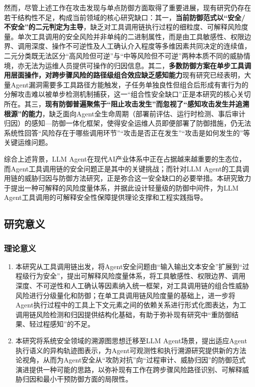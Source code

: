 然而，尽管上述工作在攻击发现与单点防御方面取得了重要进展，现有研究仍存在若干结构性不足，构成当前领域的核心研究缺口：其一，\textbf{当前防御范式以“安全/不安全”的二元判定为主导}，缺乏对工具调用链执行过程的细粒度、可解释风险度量。单次工具调用的安全风险并非单纯的二进制属性，而是由工具敏感性、权限边界、调用深度、操作不可逆性及人工确认介入程度等多维因素共同决定的连续值，二元分类既无法区分“高风险但可逆”与“中等风险但不可逆”两种本质不同的威胁情境，亦无法为运维人员提供可操作的归因信息。其二，\textbf{多数防御方案在单步工具调用层面操作，对跨步骤风险的路径级组合效应缺乏感知能力}现有研究已经表明，大量Agent漏洞需要多工具路径方能触发\cite{wu2026chainfuzzer}，子任务单独良性但组合后形成有害行为的分解攻击难以被单步检测机制捕获\cite{kothamasu2026hidden}，这一“组合性安全缺口”正是本研究的核心关切所在。其三，\textbf{现有防御普遍聚焦于“阻止攻击发生”而忽视了“感知攻击发生并追溯根源”的能力}，缺乏面向Agent全生命周期（部署前评估、运行时检测、事后审计归因）的感知—防御一体化框架，使得安全运维人员即便部署了防御措施，仍无法系统性回答“风险存在于哪些调用环节”“攻击是否正在发生”“攻击是如何发生的”等关键运维问题。

综合上述背景，LLM Agent在现代AI产业体系中正在占据越来越重要的生态位，而Agent工具调用链的安全问题正是其中的关键挑战；而针对LLM Agent的工具调用链的威胁归因与防御方法研究，正是弥合这一安全缺口的必要举措。本研究致力于提出一种可解释的风险度量体系，并据此设计轻量级的防御中间件，为LLM Agent工具调用的可解释安全性保障提供理论支撑和工程实践指导。

\subsection{研究意义}

\subsubsection{理论意义}

\begin{enumerate}
  \item 本研究从工具调用链出发，将Agent安全问题由“输入输出文本安全”扩展到“过程级行为安全”，提出可解释风险度量体系，将工具敏感性、权限边界、调用深度、不可逆性和人工确认等因素纳入统一框架，对工具调用链的组合性威胁风险进行分级量化和防御；在单工具调用链风险度量的基础上，进一步将Agent执行过程中的工具上下文元素之间的依赖关系进行形式化图表达，为工调用链风险检测和归因提供结构化基础，有助于弥补现有研究中“重防御结果、轻过程感知”的不足。

  \item 本研究将系统安全领域的溯源图思想\cite{inam2023sok,gao2021threatraptor,cheng2024kairos}迁移至LLM Agent场景，提出适应Agent执行语义的异构轨迹图表示，为Agent可观测性和执行溯源研究提供新的方法论视角，从而为Agent安全从“攻防对抗”向“过程审计、威胁归因”的防御范式演进提供一种可能的思路，以弥补现有工作在跨步骤风险路径识别、可解释威胁归因和最小干预防御方面的局限性。
\end{enumerate}

